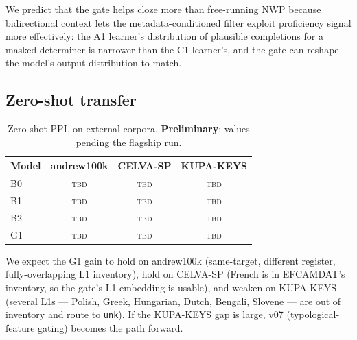 We predict that the gate helps cloze more than free-running NWP because
bidirectional context lets the metadata-conditioned filter exploit
proficiency signal more effectively: the A1 learner's distribution of
plausible completions for a masked determiner is narrower than the C1
learner's, and the gate can reshape the model's output distribution to
match.

\subsection{Zero-shot transfer}
\label{subsec:transfer}

\begin{table}[t]
\centering
\small
\begin{tabular}{lccc}
\toprule
Model & andrew100k & CELVA-SP & KUPA-KEYS \\
\midrule
B0 & \textsc{tbd} & \textsc{tbd} & \textsc{tbd} \\
B1 & \textsc{tbd} & \textsc{tbd} & \textsc{tbd} \\
B2 & \textsc{tbd} & \textsc{tbd} & \textsc{tbd} \\
G1 & \textsc{tbd} & \textsc{tbd} & \textsc{tbd} \\
\bottomrule
\end{tabular}
\caption{Zero-shot PPL on external corpora.
\textbf{Preliminary}: values pending the flagship run.}
\label{tab:transfer}
\end{table}

We expect the G1 gain to hold on andrew100k (same-target, different
register, fully-overlapping L1 inventory), hold on CELVA-SP (French is
in EFCAMDAT's inventory, so the gate's L1 embedding is usable), and
weaken on KUPA-KEYS (several L1s --- Polish, Greek, Hungarian, Dutch,
Bengali, Slovene --- are out of inventory and route to \texttt{unk}).
If the KUPA-KEYS gap is large, v07 (typological-feature gating)
becomes the path forward.
